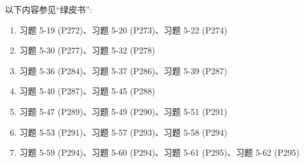\documentclass{article}
\begin{document}
以下内容参见``绿皮书'':
\begin{enumerate}[(1)]
  \item 习题 5-19 (P272)、习题 5-20 (P273)、习题 5-22 (P274)
  \item 习题 5-30 (P277)、习题 5-32 (P278)
  \item 习题 5-36 (P284)、习题 5-37 (P286)、习题 5-39 (P287)
  \item 习题 5-40 (P287)、习题 5-45 (P288)
  \item 习题 5-47 (P289)、习题 5-49 (P290)、习题 5-51 (P291)
  \item 习题 5-53 (P291)、习题 5-57 (P293)、习题 5-58 (P294)
  \item 习题 5-59 (P294)、习题 5-60 (P294)、习题 5-61 (P295)、习题 5-62 (P295)
\end{enumerate}
\end{document}
